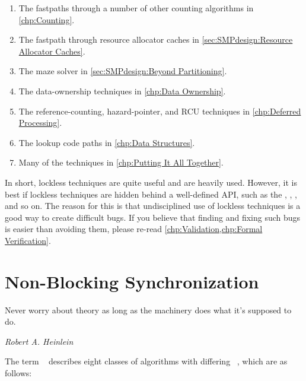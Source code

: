 \begin{enumerate}
\item	The fastpaths through a number of other counting algorithms
	in \cref{chp:Counting}.
\item	The fastpath through resource allocator caches in
	\cref{sec:SMPdesign:Resource Allocator Caches}.
\item	The maze solver in \cref{sec:SMPdesign:Beyond Partitioning}.
\item	The data-ownership techniques in \cref{chp:Data Ownership}.
\item	The reference-counting, hazard-pointer, and RCU techniques
	in \cref{chp:Deferred Processing}.
\item	The lookup code paths in \cref{chp:Data Structures}.
\item	Many of the techniques in \cref{chp:Putting It All Together}.
\end{enumerate}

In short, lockless techniques are quite useful and are heavily used.
However, it is best if lockless techniques are hidden behind a
well-defined API, such as the , ,
, and so on.
The reason for this is that undisciplined use of lockless techniques
is a good way to create difficult bugs.
If you believe that finding and fixing such bugs is easier than avoiding
them, please re-read
\cref{chp:Validation,chp:Formal Verification}.

\section{Non-Blocking Synchronization}
\label{sec:advsync:Non-Blocking Synchronization}
%
\epigraph{Never worry about theory as long as the machinery does what
	  it's supposed to do.}
	 {\emph{Robert A. Heinlein}}

The term ~\cite{MauriceHerlihy90a}
describes eight classes of  algorithms with differing
\emph{}~\cite{DanAlitarh2013PracticalProgress},
which are as follows:

